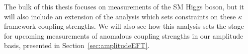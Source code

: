 

The bulk of this thesis focuses on measurements of the SM Higgs boson, but it will also include an extension of the analysis which sets constraints on these $\kappa$ framework coupling strengths. We will also see how this analysis sets the stage for upcoming measurements of anomalous coupling strengths in our amplitude basis, presented in Section~\ref{sec:amplitudeEFT}.
